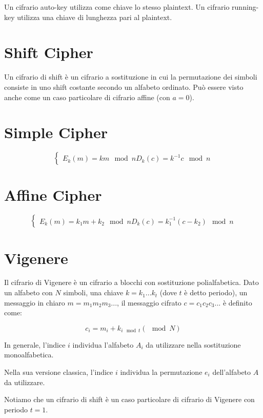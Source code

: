 Un cifrario auto-key utilizza come chiave lo stesso plaintext.
Un cifrario running-key utilizza una chiave di lunghezza pari al plaintext.

\section{Shift Cipher}
Un cifrario di shift è un cifrario a sostituzione in cui la permutazione dei simboli consiste in uno shift costante secondo un alfabeto ordinato. Può essere visto anche come un caso particolare di cifrario affine (con $a=0$).

\section{Simple Cipher}
$$
\begin{cases}
  E_{k}(m)=km \mod n
  D_{k}(c)=k^{-1}c \mod n
\end{cases}
$$

\section{Affine Cipher}
$$
\begin{cases}
  E_{k}(m)=k_{1}m+k_{2} \mod n
  D_{k}(c)=k_{1}^{-1}(c-k_{2}) \mod n
\end{cases}
$$

\section{Vigenere}
Il cifrario di Vigenere è un cifrario a blocchi con sostituzione polialfabetica.
Dato un alfabeto con $N$ simboli, una chiave $k=k_{1}...k_{t}$ (dove $t$ è detto periodo), un messaggio in chiaro $m=m_{1}m_{2}m_{3}...$, il messaggio cifrato $c=c_{1}c_{2}c_{3}...$ è definito come:

$$c_{i}=m_{i}+k_{i \mod t}(\mod N)$$

In generale, l'indice $i$ individua l'alfabeto $A_{i}$ da utilizzare nella sostituzione monoalfabetica.

Nella sua versione classica, l'indice $i$ individua la permutazione $e_{i}$ dell'alfabeto $A$ da utilizzare.

Notiamo che un cifrario di shift è un caso particolare di cifrario di Vigenere con periodo $t=1$.

